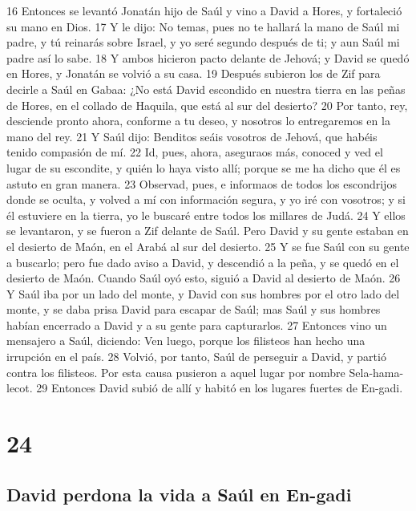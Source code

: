 16 Entonces se levantó Jonatán hijo de Saúl y vino a David a Hores, y fortaleció su mano en Dios.
17 Y le dijo: No temas, pues no te hallará la mano de Saúl mi padre, y tú reinarás sobre Israel, y yo seré segundo después de ti; y aun Saúl mi padre así lo sabe.
18 Y ambos hicieron pacto delante de Jehová; y David se quedó en Hores, y Jonatán se volvió a su casa.
19 Después subieron los de Zif para decirle a Saúl en Gabaa: ¿No está David escondido en nuestra tierra en las peñas de Hores, en el collado de Haquila, que está al sur del desierto?
20 Por tanto, rey, desciende pronto ahora, conforme a tu deseo, y nosotros lo entregaremos en la mano del rey.
21 Y Saúl dijo: Benditos seáis vosotros de Jehová, que habéis tenido compasión de mí.
22 Id, pues, ahora, aseguraos más, conoced y ved el lugar de su escondite, y quién lo haya visto allí; porque se me ha dicho que él es astuto en gran manera.
23 Observad, pues, e informaos de todos los escondrijos donde se oculta, y volved a mí con información segura, y yo iré con vosotros; y si él estuviere en la tierra, yo le buscaré entre todos los millares de Judá.
24 Y ellos se levantaron, y se fueron a Zif delante de Saúl. Pero David y su gente estaban en el desierto de Maón, en el Arabá al sur del desierto.
25 Y se fue Saúl con su gente a buscarlo; pero fue dado aviso a David, y descendió a la peña, y se quedó en el desierto de Maón. Cuando Saúl oyó esto, siguió a David al desierto de Maón.
26 Y Saúl iba por un lado del monte, y David con sus hombres por el otro lado del monte, y se daba prisa David para escapar de Saúl; mas Saúl y sus hombres habían encerrado a David y a su gente para capturarlos.
27 Entonces vino un mensajero a Saúl, diciendo: Ven luego, porque los filisteos han hecho una irrupción en el país.
28 Volvió, por tanto, Saúl de perseguir a David, y partió contra los filisteos. Por esta causa pusieron a aquel lugar por nombre Sela-hama-lecot.
29 Entonces David subió de allí y habitó en los lugares fuertes de En-gadi.

\chapter{24}

\section*{David perdona la vida a Saúl en En-gadi}



